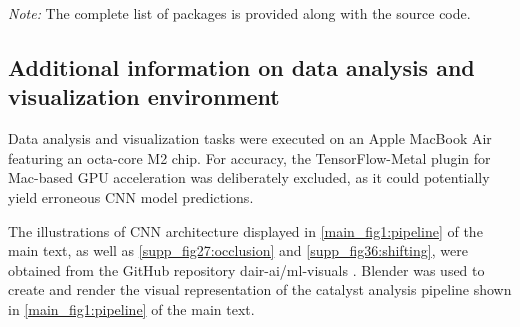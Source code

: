 \begin{table}[htbp]
  \smallskip

  \begin{flushright}
  \begin{minipage}{\textwidth}
    \footnotesize\textit{Note:} The complete list of packages is
      provided along with the source code.
  \end{minipage}
  \end{flushright}
\end{table}

\subsection{Additional information on data analysis and visualization environment}
\label{supp_sec4.2_vis_env}

Data analysis and visualization tasks were executed on an Apple MacBook Air featuring an octa-core M2 chip.
For accuracy, the TensorFlow-Metal plugin for Mac-based GPU acceleration was deliberately excluded,
as it could potentially yield erroneous CNN model predictions.

The illustrations of CNN architecture displayed in \cref{main_fig1:pipeline} of the main text,
as well as \cref{supp_fig27:occlusion} and \cref{supp_fig36:shifting},
were obtained from the GitHub repository dair-ai/ml-visuals \cite{Saravia_ML_Visuals_2021}.
Blender was used to create and render the visual representation of the
catalyst analysis pipeline shown in \cref{main_fig1:pipeline} of the main text.


